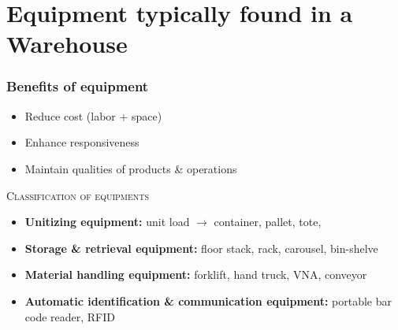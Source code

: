 \documentclass[10pt,handout,notes=show]{beamer}
\begin{document}
\section[Equipments]{Equipment typically found in a Warehouse}
\begin{frame}
  \frametitle{Benefits of equipment}

  \begin{itemize}
    \item Reduce cost (labor + space)
    \item Enhance responsiveness
    \item Maintain \alert{qualities} of products \& operations
  \end{itemize}

  \NextLine
  \textsc{Classification of equipments}
  \begin{itemize}
    \item \textbf{Unitizing equipment:} unit load $\rightarrow$ container, pallet, tote,
    \item \textbf{Storage \& retrieval equipment:} floor stack, rack, carousel, bin-shelve
    \item \textbf{Material handling equipment:} forklift, hand truck, VNA, conveyor
    \item \textbf{Automatic identification \& communication equipment:} portable bar code reader, RFID
  \end{itemize}

  \end{frame}
\end{document}
